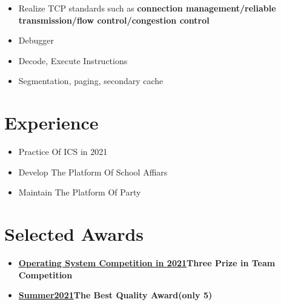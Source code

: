 \documentclass{resume}
\begin{document}
\begin{itemize}
  \item Realize TCP standards such as \textbf{connection management/reliable transmission/flow control/congestion control}
\end{itemize}

\begin{itemize}
  \item Debugger
  \item Decode, Execute Instructions
  \item Segmentation, paging, secondary cache
\end{itemize}

\section{Experience}
\begin{itemize}
  \item Practice Of ICS in 2021
\end{itemize}

\begin{itemize}
  \item Develop The Platform Of School Affiars
  \item Maintain The Platform Of Party
\end{itemize}


\section{Selected Awards}
\begin{itemize}
  \item \textbf{\href{https://os.educg.net/2021CSCC}{Operating System Competition in 2021}}\quad \textbf{Three Prize in Team Competition}
  \item \textbf{\href{ https://summer-ospp.ac.cn/ }{Summer2021}}\quad \textbf{The Best Quality Award(only 5)}
\end{itemize}
\end{document}
